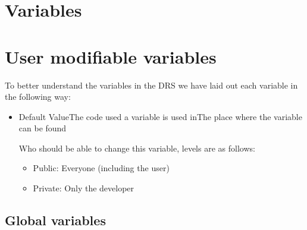\ifdevguide
\chapter{Variables}
\label{ch:variables}
\else
\chapter{User modifiable variables}
\label{ch:variables}
\fi


To better understand the variables in the DRS we have laid out each variable in the following way:

\begin{itemize}
\item {}
{Default Value}{The code used a variable is used in}{The place where the variable can be found}
{
Who should be able to change this variable, levels are as follows:
\begin{itemize}
	\item Public: Everyone (including the user)
	\item Private: Only the developer
\end{itemize}
}
\end{itemize}


\section{Global variables}
\label{ch:variables:global}


